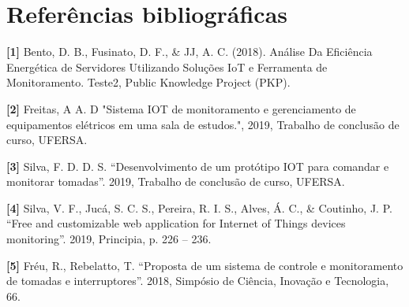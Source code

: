 \documentclass[ruledheader,noindentfirst,anapcustomindent,abntfigtabnum,tocpage=plain]{abnt}
\begin{document}
\chapter{Referências bibliográficas}\label{CAP:introducao}

\noindent \textbf{[1]} Bento, D. B., Fusinato, D. F., & JJ, A. C. (2018). Análise Da Eficiência Energética de Servidores Utilizando Soluções IoT e Ferramenta de Monitoramento. Teste2, Public Knowledge Project (PKP).

\noindent \textbf{[2]} Freitas, A A. D "Sistema IOT de monitoramento e gerenciamento de equipamentos elétricos em uma sala de estudos.", 2019, Trabalho de conclusão de curso, UFERSA.

\noindent \textbf{[3]} Silva, F. D. D. S. “Desenvolvimento de um protótipo IOT para comandar e monitorar tomadas”. 2019, Trabalho de conclusão de curso, UFERSA.

\noindent \textbf{[4]} Silva, V. F., Jucá, S. C. S., Pereira, R. I. S., Alves, Á. C., & Coutinho, J. P. “Free and customizable web application for Internet of Things devices monitoring”. 2019, Principia, p. 226 – 236.

\noindent \textbf{[5]} Fréu, R., Rebelatto, T. “Proposta de um sistema de controle e monitoramento de tomadas e interruptores”. 2018, Simpósio de Ciência, Inovação e Tecnologia, 66.
\newpage
\end{document}
